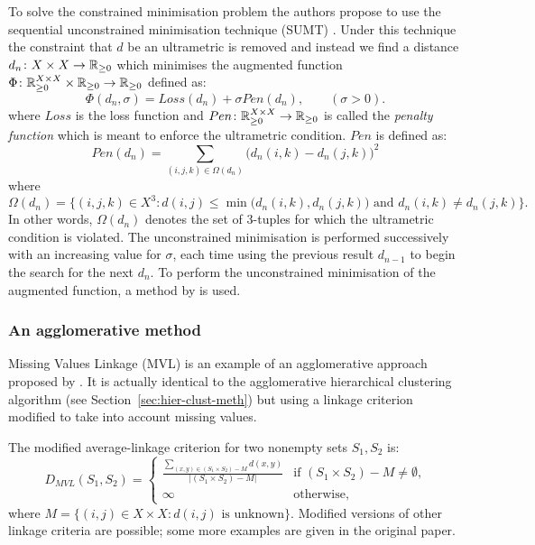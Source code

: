 To solve the constrained minimisation problem the authors propose to use the
sequential unconstrained minimisation technique (SUMT)
\cite{fiacco1964sequential}.  Under this technique the constraint that $d$ be
an ultrametric is removed and instead we find a distance $d_n \colon X \times
X \to {\mathbb R}_{\geq 0}$ which minimises the augmented function $\Phi \colon {\mathbb R}_{\geq 0}^{X
  \times X} \times {\mathbb R}_{\geq 0} \to {\mathbb R}_{\geq 0}$ defined as:
\begin{equation*}
  \label{eq:partial-dist-optimisation}
  \Phi(d_n,\sigma) = Loss(d_n) + \sigma Pen(d_n), \qquad (\sigma > 0).
\end{equation*}
where $Loss$ is the loss function and $Pen \colon {\mathbb R}_{\geq 0}^{X \times X} \to
{\mathbb R}_{\geq 0}$ is called the \textit{penalty function} which is meant to enforce the
ultrametric condition.  $Pen$ is defined as:
\begin{equation*}
  \label{eq:penalty-function}
  Pen(d_n) = \sum_{(i,j,k) \in \Omega(d_n)} \! \big(d_n(i,k) - d_n(j,k)\big)^2
\end{equation*}
where
\begin{equation*}
  \Omega(d_n) = \{(i,j,k) \in X^3 \colon d(i,j) \leq \min\big(d_n(i,k),d_n(j,k)\big)
  \text{ and } d_n(i,k) \neq d_n(j,k)\}.
\end{equation*}
In other words, $\Omega(d_n)$ denotes the set of $3$-tuples for which the
ultrametric condition is violated.  The unconstrained minimisation is
performed successively with an increasing value for $\sigma$, each time using
the previous result $d_{n-1}$ to begin the search for the next $d_n$.  To
perform the unconstrained minimisation of the augmented function, a method by
\cite{powell1977restart} is used.

\subsubsection{An agglomerative method}
\label{sec:part-dist-agglom-method}

Missing Values Linkage (MVL) is an example of an agglomerative approach
proposed by \cite{schader1992mvl}.  It is actually identical to the
agglomerative hierarchical clustering algorithm (see
Section~\ref{sec:hier-clust-meth}) but using a linkage criterion modified to
take into account missing values.

The modified
average-linkage criterion for two nonempty sets $S_1, S_2$ is:
\begin{equation*}
  D_{MVL}(S_1,S_2) =
  \begin{cases}
    \displaystyle
    \frac{\displaystyle \sum_{(x,y) \in (S_1 \times S_2) - M} d(x,y)}
         {|(S_1 \times S_2) - M|} & \text{if $(S_1
      \times S_2) - M \neq \emptyset$,} \\
    \infty & \text{otherwise},
  \end{cases}
\end{equation*}
where $M = \{(i,j) \in X \times X \colon d(i,j) \text{ is unknown}\}$.
Modified versions of other linkage criteria are possible; some more examples
are given in the original paper.

